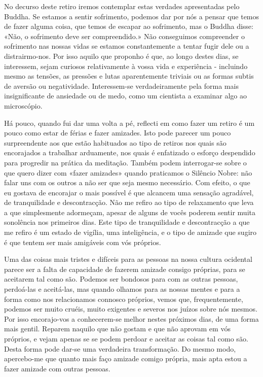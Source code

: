 No decurso deste retiro iremos contemplar estas verdades apresentadas
pelo Buddha. Se estamos a sentir sofrimento, podemos dar por nós a
pensar que temos de fazer alguma coisa, que temos de escapar ao
sofrimento, mas o Buddha disse: «Não, o sofrimento deve ser
compreendido.» Não conseguimos compreender o sofrimento nas nossas vidas
se estamos constantemente a tentar fugir dele ou a distrairmo-nos. Por
isso aquilo que proponho é que, ao longo destes dias, se interessem,
sejam curiosos relativamente à vossa vida e experiência - incluindo
mesmo as tensões, as pressões e lutas aparentemente triviais ou as
formas subtis de aversão ou negatividade. Interessem-se verdadeiramente
pela forma mais insignificante de ansiedade ou de medo, como um
cientista a examinar algo ao microscópio.

Há pouco, quando fui dar uma volta a pé, reflecti em como fazer um
retiro é um pouco como estar de férias e fazer amizades. Isto pode
parecer um pouco surpreendente aos que estão habituados ao tipo de
retiros nos quais são encorajados a trabalhar arduamente, nos quais é
enfatizado o esforço despendido para progredir na prática da meditação.
Também podem interrogar-se sobre o que quero dizer com «fazer amizades»
quando praticamos o Silêncio Nobre: não falar uns com os outros a não
ser que seja mesmo necessário. Com efeito, o que eu gostava de encorajar
o mais possível é que alcancem uma sensação agradável, de tranquilidade
e descontracção. Não me refiro ao tipo de relaxamento que leva a que
simplesmente adormeçam, apesar de alguns de vocês poderem sentir muita
sonolência nos primeiros dias. Este tipo de tranquilidade e
descontracção a que me refiro é um estado de vigília, uma inteligência,
e o tipo de amizade que sugiro é que tentem ser mais amigáveis com vós
próprios.

Uma das coisas mais tristes e difíceis para as pessoas na nossa cultura
ocidental parece ser a falta de capacidade de fazerem amizade consigo
próprias, para se aceitarem tal como são. Podemos ser bondosos para com
as outras pessoas, perdoá-las e aceitá-las, mas quando olhamos para as
nossas mentes e para a forma como nos relacionamos connosco próprios,
vemos que, frequentemente, podemos ser muito cruéis, muito exigentes e
severos nos juízos sobre nós mesmos. Por isso encorajo-vos a
conhecerem-se melhor nestes próximos dias, de uma forma mais gentil.
Reparem naquilo que não gostam e que não aprovam em vós próprios, e
vejam apenas se se podem perdoar e aceitar as coisas tal como são. Desta
forma pode dar-se uma verdadeira transformação. Do mesmo modo,
apercebo-me que quanto mais faço amizade comigo própria, mais apta estou
a fazer amizade com outras pessoas.

